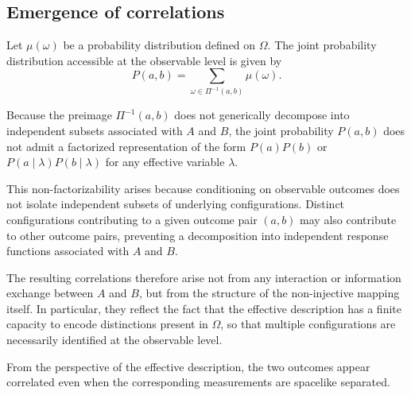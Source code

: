 \subsection{Emergence of correlations}
  \label{subsec:emergence-of-correlations}

  Let $\mu(\omega)$ be a probability distribution defined on $\Omega$.
  The joint probability distribution accessible at the observable level is given by
  \[
    P(a,b) = \sum_{\omega \in \Pi^{-1}(a,b)} \mu(\omega).
  \]

  Because the preimage $\Pi^{-1}(a,b)$ does not generically decompose into independent
  subsets associated with $A$ and $B$, the joint probability $P(a,b)$ does not admit a
  factorized representation of the form $P(a)P(b)$ or
  $P(a \mid \lambda) P(b \mid \lambda)$ for any effective variable $\lambda$.

  This non-factorizability arises because conditioning on observable outcomes does not
  isolate independent subsets of underlying configurations.
  Distinct configurations contributing to a given outcome pair $(a,b)$ may also
  contribute to other outcome pairs, preventing a decomposition into independent
  response functions associated with $A$ and $B$.

  The resulting correlations therefore arise not from any interaction or information
  exchange between $A$ and $B$, but from the structure of the non-injective mapping
  itself.
  In particular, they reflect the fact that the effective description has a finite
  capacity to encode distinctions present in $\Omega$, so that multiple configurations
  are necessarily identified at the observable level.

  From the perspective of the effective description, the two outcomes appear correlated
  even when the corresponding measurements are spacelike separated.

